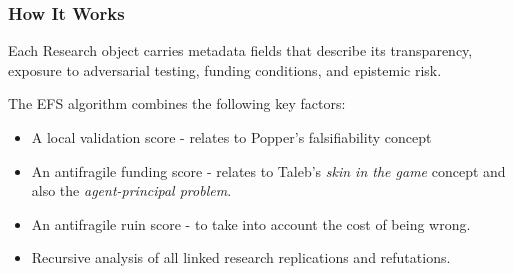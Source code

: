 \subsubsection{How It Works}
Each Research object carries metadata fields that describe its transparency, exposure to adversarial testing, funding conditions, and epistemic risk. 

The EFS algorithm combines the following key factors:
\begin{itemize}
	\item A local validation score - relates to Popper's falsifiability concept
	\item An antifragile funding score - relates to Taleb's \emph{skin in the game} concept and also the \emph{agent-principal problem}.
	\item An antifragile ruin score - to take into account the cost of being wrong.
	\item Recursive analysis of all linked research replications and refutations.
\end{itemize}


